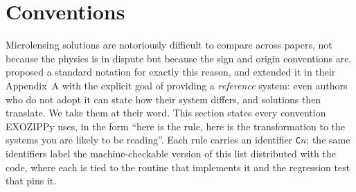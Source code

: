 %
%
%
%
%
%

\section{Conventions}
\label{sec:conventions}

Microlensing solutions are notoriously difficult to compare across papers,
not because the physics is in dispute but because the sign and origin
conventions are.  \citet{Gould:2000} proposed a standard notation for
exactly this reason, and \citet{Skowron:2011} extended it in their
Appendix~A with the explicit goal of providing a \emph{reference} system:
even authors who do not adopt it can state how their system differs, and
solutions then translate.  We take them at their word.  This section states
every convention EXOZIPPy uses, in the form ``here is the rule, here is the
transformation to the systems you are likely to be reading''.  Each rule
carries an identifier \texttt{C}$n$; the same identifiers label the
machine-checkable version of this list distributed with the code, where
each is tied to the routine that implements it and the regression test that
pins it.

